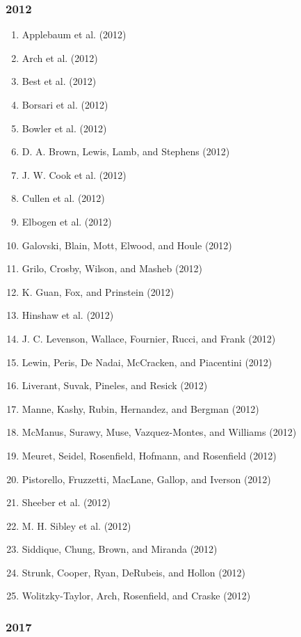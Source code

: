 \documentclass[english,man]{apa6}
\providecommand{\tightlist}{%
  \setlength{\itemsep}{0pt}\setlength{\parskip}{0pt}}
\theoremstyle{definition}
\theoremstyle{definition}
\theoremstyle{definition}
\theoremstyle{remark}
\begin{document}
\subsubsection{2012}\label{section-2}

\begin{enumerate}
\def\labelenumi{\arabic{enumi})}
\tightlist
\item
  Applebaum et al. (2012)
\item
  Arch et al. (2012)
\item
  Best et al. (2012)
\item
  Borsari et al. (2012)
\item
  Bowler et al. (2012)
\item
  D. A. Brown, Lewis, Lamb, and Stephens (2012)
\item
  J. W. Cook et al. (2012)
\item
  Cullen et al. (2012)
\item
  Elbogen et al. (2012)
\item
  Galovski, Blain, Mott, Elwood, and Houle (2012)
\item
  Grilo, Crosby, Wilson, and Masheb (2012)
\item
  K. Guan, Fox, and Prinstein (2012)
\item
  Hinshaw et al. (2012)
\item
  J. C. Levenson, Wallace, Fournier, Rucci, and Frank (2012)
\item
  Lewin, Peris, De Nadai, McCracken, and Piacentini (2012)
\item
  Liverant, Suvak, Pineles, and Resick (2012)
\item
  Manne, Kashy, Rubin, Hernandez, and Bergman (2012)
\item
  McManus, Surawy, Muse, Vazquez-Montes, and Williams (2012)
\item
  Meuret, Seidel, Rosenfield, Hofmann, and Rosenfield (2012)
\item
  Pistorello, Fruzzetti, MacLane, Gallop, and Iverson (2012)
\item
  Sheeber et al. (2012)
\item
  M. H. Sibley et al. (2012)
\item
  Siddique, Chung, Brown, and Miranda (2012)
\item
  Strunk, Cooper, Ryan, DeRubeis, and Hollon (2012)
\item
  Wolitzky-Taylor, Arch, Rosenfield, and Craske (2012)
\end{enumerate}

\subsubsection{2017}\label{section-3}
\end{document}
